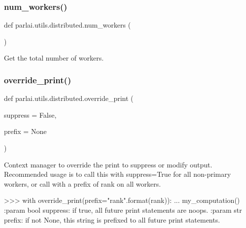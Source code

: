 \subsubsection{\texorpdfstring{num\+\_\+workers()}{num\_workers()}}
{\footnotesize\ttfamily def parlai.\+utils.\+distributed.\+num\+\_\+workers (\begin{DoxyParamCaption}{ }\end{DoxyParamCaption})}

\begin{DoxyVerb}Get the total number of workers.
\end{DoxyVerb}
 \mbox{\label{namespaceparlai_1_1utils_1_1distributed_a601345e55fc3fc3845c43efa1a04db56}} 
\subsubsection{\texorpdfstring{override\+\_\+print()}{override\_print()}}
{\footnotesize\ttfamily def parlai.\+utils.\+distributed.\+override\+\_\+print (\begin{DoxyParamCaption}\item[{}]{suppress = {\ttfamily False},  }\item[{}]{prefix = {\ttfamily None} }\end{DoxyParamCaption})}

\begin{DoxyVerb}Context manager to override the print to suppress or modify output. Recommended
usage is to call this with suppress=True for all non-primary workers, or call with a
prefix of rank on all workers.

>>> with override_print(prefix="rank{}".format(rank)):
...     my_computation()
:param bool suppress:
    if true, all future print statements are noops.
:param str prefix:
    if not None, this string is prefixed to all future print statements.
\end{DoxyVerb}
 \mbox{\label{namespaceparlai_1_1utils_1_1distributed_a269d3c7284127d9b287b9b61e9161de6}} 
